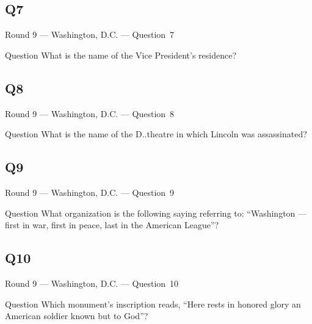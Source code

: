 \documentclass[11pt]{beamer}
\begin{document}
\subsection*{Q7}
\begin{frame}[t]{Round 9 --- Washington, D.C. --- \mbox{Question 7}}
    \vspace{-0.5em}
    \begin{block}{Question}
        What is the name of the Vice President's residence?
    \end{block}
\end{frame}
\subsection*{Q8}
\begin{frame}[t]{Round 9 --- Washington, D.C. --- \mbox{Question 8}}
    \vspace{-0.5em}
    \begin{block}{Question}
        What is the name of the D.\@C.\@ theatre in which Lincoln was assassinated?
    \end{block}
\end{frame}
\subsection*{Q9}
\begin{frame}[t]{Round 9 --- Washington, D.C. --- \mbox{Question 9}}
    \vspace{-0.5em}
    \begin{block}{Question}
        What organization is the following saying referring to: ``Washington --- first in war, first in peace, last in the American League''?
    \end{block}
\end{frame}
\subsection*{Q10}
\begin{frame}[t]{Round 9 --- Washington, D.C. --- \mbox{Question 10}}
    \vspace{-0.5em}
    \begin{block}{Question}
        Which monument's inscription reads, ``Here rests in honored glory an American soldier known but to God''?
    \end{block}
\end{frame}
\end{document}
